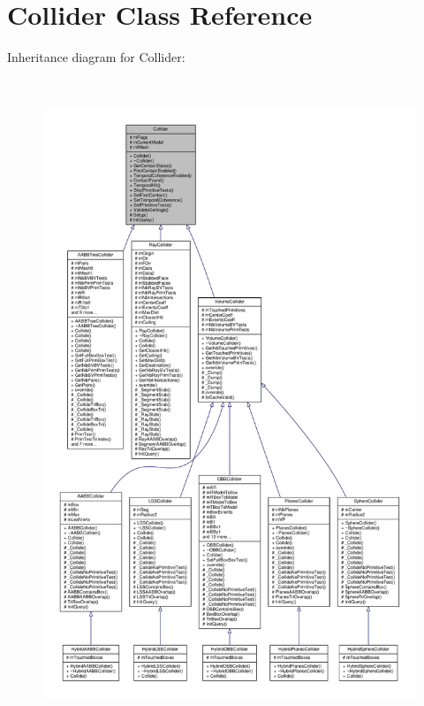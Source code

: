 \hypertarget{classCollider}{}\section{Collider Class Reference}
\label{classCollider}


Inheritance diagram for Collider\+:
\nopagebreak
\begin{figure}[H]
\begin{center}
\leavevmode
\includegraphics[height=550pt]{dc/da1/classCollider__inherit__graph}
\end{center}
\end{figure}


